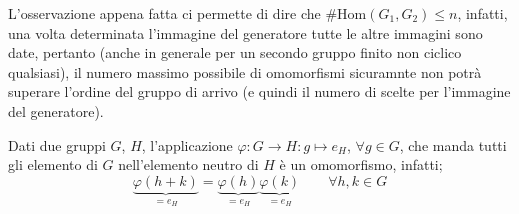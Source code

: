 \documentclass[11pt]{scrartcl}
\begin{document}
L'osservazione appena fatta ci permette di dire che $\#\text{Hom}(G_1,G_2) \leq n$, infatti, una volta determinata l'immagine del generatore tutte le altre immagini sono date, pertanto (anche in generale per un secondo gruppo finito non ciclico qualsiasi), il numero massimo possibile di omomorfismi sicuramnte non potrà superare l'ordine del gruppo di arrivo (e quindi il numero di scelte per l'immagine del generatore).

\begin{remark}
Dati due gruppi $G$, $H$, l'applicazione $\varphi: G \longrightarrow H: g \longmapsto e_H$, $\forall g \in G$, che manda tutti gli elemento di $G$ nell'elemento neutro di $H$ è un omomorfismo, infatti;
	\[ \underbrace{\varphi(h+k)}_{= e_H} = \underbrace{\varphi(h)}_{= e_H}\underbrace{\varphi(k)}_{= e_H}
	\qquad
	\forall h,k \in G
	\]
\end{remark}
\end{document}

